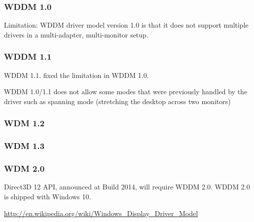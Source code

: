 \subsubsection{WDDM 1.0}

Limitation: WDDM driver model version 1.0 is that it does not support multiple
drivers in a multi-adapter, multi-monitor setup.

\subsubsection{WDDM 1.1}

WDDM 1.1. fixed the limitation in WDDM 1.0.


WDDM 1.0/1.1 does not allow some modes that were previously handled by the driver such as spanning mode (stretching the desktop across two monitors)

\subsubsection{WDM 1.2}

\subsubsection{WDM 1.3}

\subsubsection{WDM 2.0}

Direct3D 12 API, announced at Build 2014, will require WDDM 2.0.
WDDM 2.0 is shipped with Windows 10.

\url{http://en.wikipedia.org/wiki/Windows_Display_Driver_Model}



